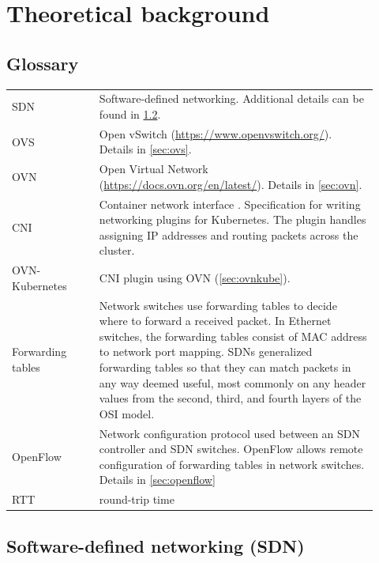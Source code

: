 \chapter{Theoretical background}
\label{chap:refs}

\section{Glossary}

\begin{tabular}{p{0.22\linewidth}p{0.7\linewidth}}
    SDN & Software-defined networking. Additional details can be found in \cref{sec:sdn}. \\ %

    OVS & Open vSwitch (\url{https://www.openvswitch.org/}). Details in \cref{sec:ovs}. \\ %

    OVN & Open Virtual Network (\url{https://docs.ovn.org/en/latest/}). Details in \cref{sec:ovn}. \\ %

    CNI & Container network interface \cite{CNI}. Specification for writing networking plugins for Kubernetes. The plugin handles assigning IP addresses and routing packets across the cluster. \\

    OVN-Kubernetes & CNI plugin using OVN (\cref{sec:ovnkube}). \\

    Forwarding tables & Network switches use forwarding tables to decide where to forward a received packet. In Ethernet switches, the forwarding tables consist of MAC address to network port mapping. SDNs generalized forwarding tables so that they can match packets in any way deemed useful, most commonly on any header values from the second, third, and fourth layers of the OSI model. \\

    OpenFlow & Network configuration protocol used between an SDN controller and SDN switches. OpenFlow allows remote configuration of forwarding tables in network switches. Details in \cref{sec:openflow} \\

    RTT & round-trip time  \\

\end{tabular}

\section{Software-defined networking (SDN)}
\label{sec:sdn}


